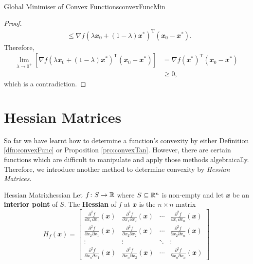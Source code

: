 \documentclass[math, code]{amznotes}
\theoremstyle{remark}
\begin{document}
\begin{thmbox}{Global Minimiser of Convex Functions}{convexFuncMin}
\begin{proof}
\begin{align*}
            & \leq \nabla f\left(\lambda\mathbfit{x}_0 + (1 - \lambda)\mathbfit{x}^*\right)^{\mathrm{T}}(\mathbfit{x_0 - x^*}).
        \end{align*}
        Therefore,
        \begin{align*}
            \lim_{\lambda \to 0^+}\left[\nabla f\left(\lambda\mathbfit{x}_0 + (1 - \lambda)\mathbfit{x}^*\right)^{\mathrm{T}}(\mathbfit{x_0 - x^*})\right] & = \nabla f(\mathbfit{x}^*)^{\mathrm{T}}(\mathbfit{x_0 - x^*}) \\
            & \geq 0,
        \end{align*}
        which is a contradiction.
    \end{proof}
\end{thmbox}

\section{Hessian Matrices}
So far we have learnt how to determine a function's convexity by either Definition \ref{dfn:convexFunc} or Proposition \ref{pro:convexTan}. However, there are certain functions which are difficult to manipulate and apply those methods algebraically. Therefore, we introduce another method to determine convexity by \textit{Hessian Matrices}.
\begin{dfnbox}{Hessian Matrix}{hessian}
    Let $f \colon S \to \mathbb{R}$ where $S \subseteq \mathbb{R}^n$ is non-empty and let $\mathbfit{x}$ be an {\color{red} \textbf{interior point}} of $S$. The {\color{red} \textbf{Hessian}} of $f$ at $\mathbfit{x}$ is the $n \times n$ matrix
    \begin{displaymath}
        H_f(\mathbfit{x}) = \begin{bmatrix}
            \frac{\partial^2f}{\partial x_1 \partial x_1}(\mathbfit{x}) & \frac{\partial^2f}{\partial x_1 \partial x_2}(\mathbfit{x}) & \cdots & \frac{\partial^2f}{\partial x_1 \partial x_n}(\mathbfit{x}) \\
            \frac{\partial^2f}{\partial x_2 \partial x_1}(\mathbfit{x}) & \frac{\partial^2f}{\partial x_2 \partial x_2}(\mathbfit{x}) & \cdots & \frac{\partial^2f}{\partial x_2 \partial x_n}(\mathbfit{x}) \\
            \vdots & \vdots & \ddots & \vdots \\
            \frac{\partial^2f}{\partial x_n \partial x_1}(\mathbfit{x}) & \frac{\partial^2f}{\partial x_n \partial x_2}(\mathbfit{x}) & \cdots & \frac{\partial^2f}{\partial x_n \partial x_n}(\mathbfit{x})
        \end{bmatrix}
    \end{displaymath}
\end{dfnbox}
\end{document}

